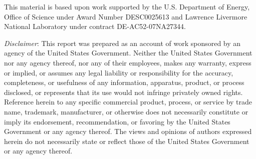 \begin{acks}
  This material is based upon work supported by the U.S. Department of Energy,
  Office of Science under Award Number DESC0025613 and Lawrence Livermore National
  Laboratory under contract DE-AC52-07NA27344.

  \emph{Disclaimer}: This report was prepared as an account of work sponsored by
  an agency of the United States Government. Neither the United States
  Government nor any agency thereof, nor any of their employees, makes any
  warranty, express or implied, or assumes any legal liability or responsibility
  for the accuracy, completeness, or usefulness of any information, apparatus,
  product, or process disclosed, or represents that its use would not infringe
  privately owned rights. Reference herein to any specific commercial product,
  process, or service by trade name, trademark, manufacturer, or otherwise does
  not necessarily constitute or imply its endorsement, recommendation, or
  favoring by the United States Government or any agency thereof. The views and
  opinions of authors expressed herein do not necessarily state or reflect those
  of the United States Government or any agency thereof.
\end{acks}
